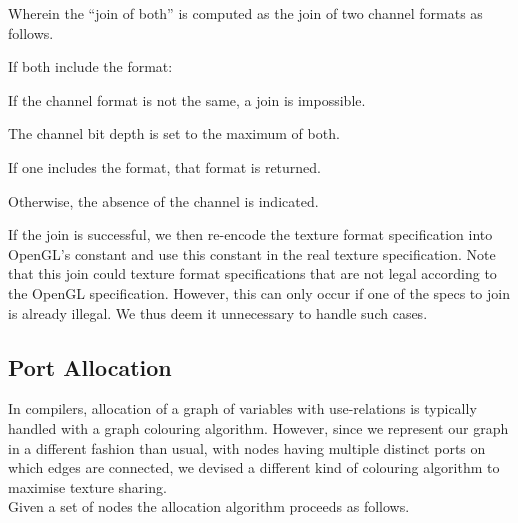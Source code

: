 \documentclass[format=sigconf]{acmart}
\begin{document}
Wherein the ``join of both'' is computed as the join of two channel formats as follows.

\begin{step}
\item If both include the format:
  \begin{step}
  \item If the channel format is not the same, a join is impossible.
  \item The channel bit depth is set to the maximum of both.
  \end{step}
\item If one includes the format, that format is returned.
\item Otherwise, the absence of the channel is indicated.
\end{step}

If the join is successful, we then re-encode the texture format specification into OpenGL's constant and use this constant in the real texture specification. Note that this join could texture format specifications that are not legal according to the OpenGL specification. However, this can only occur if one of the specs to join is already illegal. We thus deem it unnecessary to handle such cases.

\subsection{Port Allocation}\label{port-allocation}
In compilers, allocation of a graph of variables with use-relations is typically handled with a graph colouring algorithm. However, since we represent our graph in a different fashion than usual, with nodes having multiple distinct ports on which edges are connected, we devised a different kind of colouring algorithm to maximise texture sharing. \\

Given a set of nodes the allocation algorithm proceeds as follows.
\end{document}
